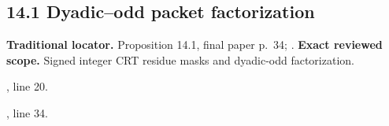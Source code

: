 \subsection{14.1 Dyadic–odd packet factorization}
\label{result:14.1}
\textbf{Traditional locator.} Proposition 14.1, final paper p.~34; .
\textbf{Exact reviewed scope.} Signed integer CRT residue masks and dyadic-odd factorization.
{\small{}\par}
{\footnotesize\color{muted}, line 20.\par}\smallskip
{\small{}\par}
{\footnotesize\color{muted}, line 34.\par}\smallskip
